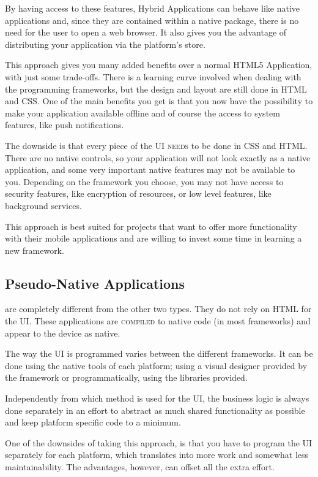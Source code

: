By having access to these features, Hybrid Applications can behave like native applications and, since they are contained within a native package, there is no need for the user to open a web browser. It also gives you the advantage of distributing your application via the platform's store.

This approach gives you many added benefits over a normal HTML5 Application, with just some trade-offs. There is a learning curve involved when dealing with the programming frameworks, but the design and layout are still done in HTML and CSS. One of the main benefits you get is that you now have the possibility to make your application available offline and of course the access to system features, like push notifications. 

The downside is that every piece of the \ac{UI} \textsc{needs} to be done in CSS and HTML. There are no native controls, so your application will not look exactly as a native application, and some very important native features may not be available to you. Depending on the framework you choose, you may not have access to security features, like encryption of resources, or low level features, like background services.  

This approach is best suited for projects that want to offer more functionality with their mobile applications and are willing to invest some time in learning a new framework.  

\subsection{Pseudo-Native Applications}\label{sec:pseudo_app}
 are completely different from the other two types. They do not rely on HTML for the \ac{UI}. These applications are \textsc{compiled} to native code (in most frameworks) and appear to the device as native.


The way the \ac{UI} is programmed varies between the different frameworks. It can be done using the native tools of each platform; using a visual designer provided by the framework or programmatically, using the libraries provided.

Independently from which method is used for the \ac{UI}, the business logic is always done separately in an effort to abstract as much shared functionality as possible and keep platform specific code to a minimum.

One of the downsides of taking this approach, is that you have to program the \ac{UI} separately for each platform, which translates into more work and somewhat less maintainability. The advantages, however, can offset all the extra effort.

